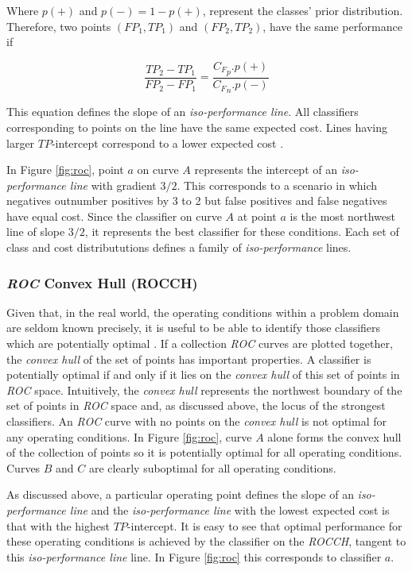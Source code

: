 \documentclass[10pt]{unbthesis}
\begin{document}
Where \(p(+)\) and \(p(-) = 1 - p(+)\), represent the classes' prior
distribution. Therefore, two points \((FP_1, TP_1)\) and \((FP_2,
TP_2)\), have the same performance if 

\begin{equation}
  \frac{TP_2 - TP_1}{FP_2 - FP_1} = \frac{{C_F}_p . p(+)}{{C_F}_n . p(-)}
\end{equation}

This equation defines the slope of an \textit{iso-performance
  line}. All classifiers corresponding to points on the line have the
same expected cost. Lines having larger \(TP\)-intercept correspond to
a lower expected cost \cite{RefWorks:61}.

In Figure \ref{fig:roc}, point \(a\) on curve \(A\) represents the
intercept of an \textit{iso-performance line} with gradient
\(3/2\). This corresponds to a scenario in which negatives outnumber
positives by 3 to 2 but false positives and false negatives have equal
cost. Since the classifier on curve \(A\) at point \(a\) is the most
northwest line of slope \(3/2\), it represents the best classifier for
these conditions. Each set of class and cost distribututions defines a
family of \textit{iso-performance} lines.


\subsubsection{\textit{ROC} Convex Hull (ROCCH)}
Given that, in the real world, the operating conditions within a
problem domain are seldom known precisely, it is useful to be able to
identify those classifiers which are potentially optimal
\cite{RefWorks:61}. If a collection \textit{ROC} curves are plotted
together, the \textit{convex hull} of the set of points has important
properties. A classifier is potentially optimal if and only if it lies
on the \textit{convex hull} of this set of points in \textit{ROC}
space. Intuitively, the \textit{convex hull} represents the northwest
boundary of the set of points in \textit{ROC} space and, as discussed
above, the locus of the strongest classifiers. An \textit{ROC} curve
with no points on the \textit{convex hull} is not optimal for any
operating conditions. In Figure \ref{fig:roc}, curve \(A\) alone forms
the convex hull of the collection of points so it is potentially
optimal for all operating conditions. Curves \(B\) and \(C\) are
clearly suboptimal for all operating conditions.

As discussed above, a particular operating point defines the slope of
an \textit{iso-performance line} and the \textit{iso-performance line}
with the lowest expected cost is that with the highest
\(TP\)-intercept. It is easy to see that optimal performance for these
operating conditions is achieved by the classifier on the
\textit{ROCCH}, tangent to this \textit{iso-performance line} line. In
Figure \ref{fig:roc} this corresponds to classifier \(a\).
\end{document}
